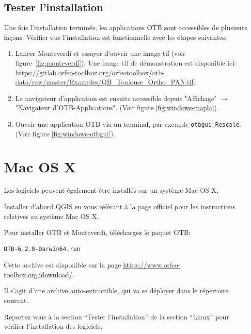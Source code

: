\documentclass[10pt,a4paper]{article}
\begin{document}
\subsection{Tester l'installation}
Une fois l'installation terminée, les applications OTB sont accessibles de
plusieurs façons. Vérifier que l'installation est fonctionnelle avec les étapes
suivantes:
\begin{enumerate}

\item Lancer Monteverdi et essayer d'ouvrir une image tif (voir
figure~\ref{fig:monteverdi}). Une image tif de démonstration est disponible ici:
\url{https://gitlab.orfeo-toolbox.org/orfeotoolbox/otb-data/raw/master/Examples/QB\_Toulouse\_Ortho\_PAN.tif}.

\item Le navigateur d'application est ensuite accessible depuis "Affichage"
$\rightarrow$ "Navigateur d'OTB-Applications".
(Voir figure \ref{fig:windows-mapla}).

\item Ouvrir une application OTB via un terminal, par exemple
\texttt{otbgui\_Rescale}. (Voir figure \ref{fig:windows-otbgui}).

\end{enumerate}

\clearpage
\section{Mac OS X}

Les logiciels peuvent également être installés sur un système Mac OS X.

Installer d'abord QGIS en vous référant à la page officiel pour les instructions
relatives au système Mac OS X.

Pour installer OTB et Monteverdi, téléchargez le paquet OTB:

\begin{verbatim}
OTB-6.2.0-Darwin64.run
\end{verbatim}

Cette archive est disponible sur la page \url{https://www.orfeo-toolbox.org/download/}.

Il s'agit d'une archive auto-extractible, qui va se déployer dans le répertoire
courant.

Reportez vous à la section ``Tester l'installation'' de la section ``Linux''
pour vérifier l'installation des logiciels.
\end{document}
